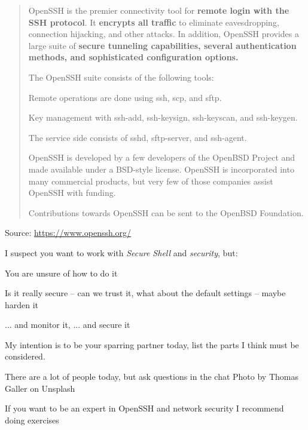 \documentclass[Screen16to9,17pt]{foils}
\begin{document}
\begin{quote}
OpenSSH is the premier connectivity tool for {\bf remote login with the SSH protocol}. It {\bf encrypts all traffic} to eliminate eavesdropping, connection hijacking, and other attacks. In addition, OpenSSH provides a large suite of {\bf secure tunneling capabilities, several authentication methods, and sophisticated configuration options.}

The OpenSSH suite consists of the following tools:
\begin{list2}
\item Remote operations are done using ssh, scp, and sftp.
\item Key management with ssh-add, ssh-keysign, ssh-keyscan, and ssh-keygen.
\item The service side consists of sshd, sftp-server, and ssh-agent.
\end{list2}

OpenSSH is developed by a few developers of the OpenBSD Project and made available under a BSD-style license. OpenSSH is incorporated into many commercial products, but very few of those companies assist OpenSSH with funding.

Contributions towards OpenSSH can be sent to the OpenBSD Foundation.
\end{quote}
Source: \url{https://www.openssh.org/}






I suspect you want to work with \emph{Secure Shell} and \emph{security}, but:
\begin{list2}
\item You are unsure of how to do it
\item Is it really secure -- can we trust it, what about the default settings -- maybe harden it
\item ... and monitor it, ... and secure it

\end{list2}

My intention is to be your sparring partner today, list the parts I think must be considered.

There are a lot of people today, but ask questions in the chat
\hfill  Photo by Thomas Galler on Unsplash


If you want to be an expert in OpenSSH and network security I recommend doing exercises
\end{document}
